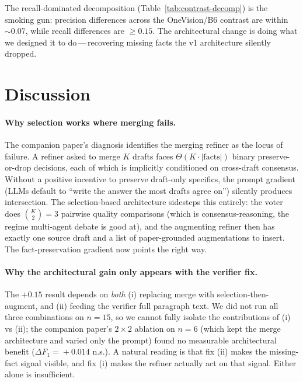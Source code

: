 \documentclass[11pt,a4paper]{article}
\begin{document}
The recall-dominated decomposition (Table~\ref{tab:contrast-decomp})
is the smoking gun: precision differences across the OneVision/B6
contrast are within $\sim 0.07$, while recall differences are
$\geq 0.15$. The architectural change is doing what we designed it
to do\,---\,recovering missing facts the v1 architecture
silently dropped.

\section{Discussion}
\label{sec:discussion}

\paragraph{Why selection works where merging fails.}
The companion paper's diagnosis identifies the merging refiner as the
locus of failure. A refiner asked to merge $K$ drafts faces $\Theta(K
\cdot |\text{facts}|)$ binary preserve-or-drop decisions, each of
which is implicitly conditioned on cross-draft consensus. Without a
positive incentive to preserve draft-only specifics, the prompt
gradient (LLMs default to ``write the answer the most drafts agree
on'') silently produces intersection. The selection-based architecture
sidesteps this entirely: the voter does $\binom{K}{2}=3$ pairwise
quality comparisons (which is consensus-reasoning, the regime
multi-agent debate is good at), and the augmenting refiner then has
exactly one source draft and a list of paper-grounded augmentations
to insert. The fact-preservation gradient now points the right way.

\paragraph{Why the architectural gain only appears with the verifier
fix.}
The $+0.15$ result depends on \emph{both} (i) replacing merge with
selection-then-augment, and (ii) feeding the verifier full paragraph
text. We did not run all three combinations on $n=15$, so we cannot
fully isolate the contributions of (i) vs (ii); the companion paper's
$2\times 2$ ablation on $n=6$ (which kept the merge architecture and
varied only the prompt) found no measurable architectural benefit
($\Delta F_1\!=\!+0.014$ n.s.). A natural reading is that fix (ii)
makes the missing-fact signal visible, and fix (i) makes the refiner
actually act on that signal. Either alone is insufficient.
\end{document}
